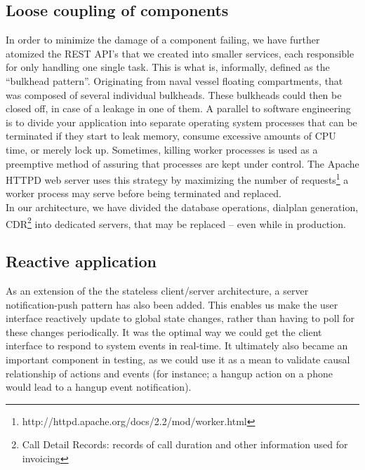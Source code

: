 \subsection{Loose coupling of components} 
In order to minimize the damage of a component failing, we have further atomized the REST API's that we created into smaller services, each responsible for only handling one single task. This is what is, informally, defined as the ``bulkhead pattern''. Originating from naval vessel floating compartments, that was composed of several individual bulkheads. These bulkheads could then be closed off, in case of a leakage in one of them. A parallel to software engineering is to divide your application into separate operating system processes that can be terminated if they start to leak memory, consume excessive amounts of CPU time, or merely lock up. Sometimes, killing worker processes is used as a preemptive method of assuring that processes are kept under control. The Apache HTTPD web server uses this strategy by maximizing the number of requests\footnote{http://httpd.apache.org/docs/2.2/mod/worker.html} a worker process may serve before being terminated and replaced.\\
In our architecture, we have divided the database operations, dialplan generation, CDR\footnote{Call Detail Records: records of call duration and other information used for invoicing} into dedicated servers, that may be replaced -- even while in production.

\subsection{Reactive application}
\label{ssec:server_notifications}
As an extension of the the stateless client/server architecture, a server notification-push pattern has also been added. This enables us make the user interface reactively update to global state changes, rather than having to poll for these changes periodically. It was the optimal way we could get the client interface to respond to system events in real-time. It ultimately also became an important component in testing, as we could use it as a mean to validate causal relationship of actions and events (for instance; a hangup action on a phone would lead to a hangup event notification).

